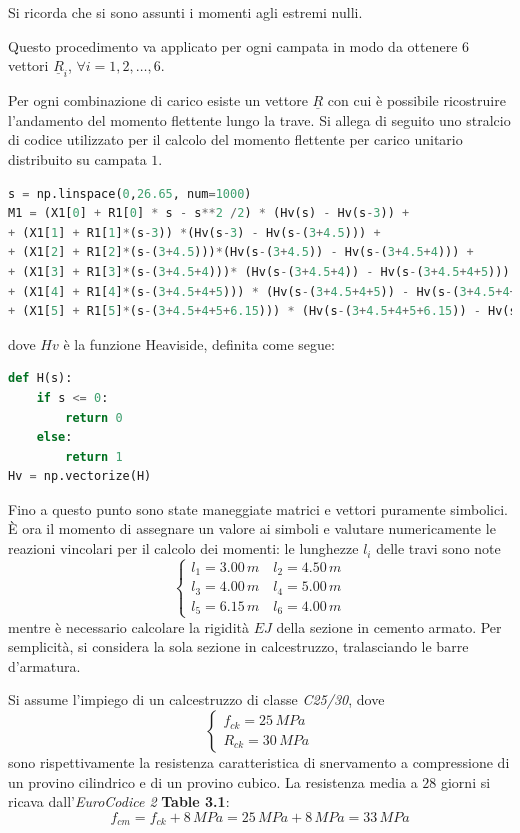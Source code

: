 Si ricorda che si sono assunti i momenti agli estremi nulli.

Questo procedimento va applicato per ogni campata in modo da ottenere $6$ vettori $\underline{R}_i$, $\forall i=1, 2, \dots, 6$.

Per ogni combinazione di carico esiste un vettore $\underline{R}$ con cui è possibile ricostruire l'andamento del momento flettente lungo la trave. 
Si allega di seguito uno stralcio di codice utilizzato per il calcolo del momento flettente per carico unitario distribuito su campata $1$.

\begin{lstlisting}[language=Python]
s = np.linspace(0,26.65, num=1000)
M1 = (X1[0] + R1[0] * s - s**2 /2) * (Hv(s) - Hv(s-3)) + 
+ (X1[1] + R1[1]*(s-3)) *(Hv(s-3) - Hv(s-(3+4.5))) + 
+ (X1[2] + R1[2]*(s-(3+4.5)))*(Hv(s-(3+4.5)) - Hv(s-(3+4.5+4))) + 
+ (X1[3] + R1[3]*(s-(3+4.5+4)))* (Hv(s-(3+4.5+4)) - Hv(s-(3+4.5+4+5))) + 
+ (X1[4] + R1[4]*(s-(3+4.5+4+5))) * (Hv(s-(3+4.5+4+5)) - Hv(s-(3+4.5+4+5+6.15))) + 
+ (X1[5] + R1[5]*(s-(3+4.5+4+5+6.15))) * (Hv(s-(3+4.5+4+5+6.15)) - Hv(s-(3+4.5+4+5+6.15+4)))
\end{lstlisting}
dove $Hv$ è la funzione Heaviside, definita come segue:

\begin{lstlisting}[language=Python]
def H(s):
    if s <= 0:
        return 0
    else:
        return 1
Hv = np.vectorize(H)
\end{lstlisting}

Fino a questo punto sono state maneggiate matrici e vettori puramente simbolici. È ora il momento di  assegnare un valore ai simboli e valutare numericamente le reazioni vincolari per il calcolo dei momenti: le lunghezze $l_i$ delle travi sono note
\begin{equation*}
 \begin{cases}
  l_1 = 3.00\,m \quad l_2 = 4.50\,m\\
  l_3 = 4.00\,m \quad l_4 = 5.00\,m\\
  l_5 = 6.15\,m \quad l_6 = 4.00\,m
 \end{cases}
\end{equation*}
mentre è necessario calcolare la rigidità $EJ$ della sezione in cemento armato. Per semplicità, si considera la sola sezione in calcestruzzo, tralasciando le barre d'armatura.

Si assume l'impiego di un calcestruzzo di classe \emph{C25/30}, dove
\begin{equation*}
 \begin{cases}
 	f_{ck} = 25\,MPa\\
 	R_{ck} = 30\,MPa
 \end{cases}
\end{equation*}
sono rispettivamente la resistenza caratteristica di snervamento a compressione di un provino cilindrico e di un provino cubico. La resistenza media a $28$ giorni si ricava dall'\emph{EuroCodice 2} \textbf{Table 3.1}:
\begin{equation*}
	f_{cm} = f_{ck} + 8\,MPa = 25\,MPa + 8\,MPa = 33\,MPa
\end{equation*}


